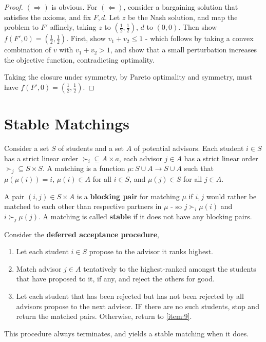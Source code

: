 \begin{proof}
  $(\Rightarrow)$ is obvious. For $(\Leftarrow)$, consider a
  bargaining solution that satisfies the axioms, and fix $F, d$. Let
  $z$ be the Nash solution, and map the problem to $F'$ affinely,
  taking $z$ to $(\frac{1}{2}, \frac{1}{2})$, $d$ to $(0, 0)$. Then
  show $f(F', 0) = (\frac{1}{2}, \frac{1}{2})$. First, show $v_{1} +
  v_{2} \leq 1$ - which follows by taking a convex combination of $v$
  with $v_{1} + v_{2} > 1$, and show that a small perturbation
  increases the objective function, contradicting optimality.

  Taking the closure under symmetry, by Pareto optimality and
  symmetry, must have $f(F', 0) = (\frac{1}{2}, \frac{1}{2})$.
\end{proof}

\section{Stable Matchings}
\label{sec:stable-matchings}

\begin{defn}
  \label{sec:stable-matchings-1}
  Consider a set $S$ of students and a set $A$ of potential advisors.
  Each student $i \in S$ has a strict linear order $\succ_{i}
  \subseteq A \times a$, each advisor $j \in A$ has a strict linear
  order $\succ_{j} \subseteq S \times S$.  A matching is a function
  $\mu: S \cup A \rightarrow S \cup A$ such that $\mu(\mu(i)) = i$,
  $\mu(i) \in A$ for all $i \in S$, and $\mu(j) \in S$ for all $j \in
  A$.

  A pair $(i, j) \in S \times A$  is a \textbf{blocking pair} for
  matching $\mu$ if $i, j$ would rather be matched to each other than
  respective partners in $\mu$ - so $j \succ_{i} \mu(i)$ and $i
  \succ_{j} \mu(j)$.  A matching is called \textbf{stable} if it
  does not have any blocking pairs.
\end{defn}

\begin{thm}
  \label{sec:stable-matchings-2}
  Consider the \textbf{deferred acceptance procedure},
  \begin{enumerate}
  \item Let each student $i \in S$ propose to the advisor it ranks highest.
  \item\label{item:9} Match advisor $j \in A$ tentatively to the highest-ranked
    amongst the students that have proposed to it, if any, and reject
    the others for good.
  \item Let each student that has been rejected but has not been
    rejected by all advisors propose to the next advisor. IF there are
    no such students, stop and return the matched pairs.  Otherwise,
    return to \ref{item:9}.
  \end{enumerate}

  This procedure always terminates, and yields a stable matching when
  it does.
\end{thm}

